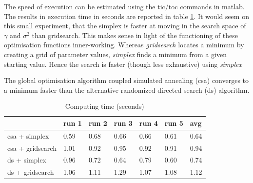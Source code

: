\documentclass[11pt, a4paper]{article}
\begin{document}
The speed of execution can be estimated using the tic/toc commands in
matlab. The results in execution time in seconds are reported in table
\ref{tab:computing_param}. It would seem on this small experiment,
that the simplex is faster at moving in the search space of $\gamma$
and $\sigma^2$ than gridsearch. This makes sense in light of the
functioning of these optimisation functions inner-working. Whereas
\emph{gridsearch} locates a minimum by creating a grid of parameter
values, \emph{simplex} finds a minimum from a given starting
value. Hence the search is faster (though less exhaustive) using
\emph{simplex}

The global optimisation algorithm coupled simulated annealing (csa)
converges to a minimum faster than the alternative randomized directed
search (ds) algorithm.

\begin{table}[H]
  \centering
  \begin{tabular}{l|l|l|l|l|l|l|}
    \cline{2-7}
    & run 1 & run 2 & run 3 & run 4 & run 5 & avg  \\ \hline
    \multicolumn{1}{|l|}{csa + simplex}    & 0.59  & 0.68  & 0.66  & 0.66  & 0.61  & 0.64 \\ \hline
    \multicolumn{1}{|l|}{csa + gridsearch} & 1.01  & 0.92  & 0.95  & 0.92  & 0.91  & 0.94 \\ \hline
    \multicolumn{1}{|l|}{ds + simplex}     & 0.96  & 0.72  & 0.64  & 0.79  & 0.60  & 0.74 \\ \hline
    \multicolumn{1}{|l|}{ds + gridsearch}  & 1.06  & 1.11  & 1.29  & 1.07  & 1.08  & 1.12 \\ \hline
  \end{tabular}
  \caption{Computing time (seconds)}
  \label{tab:computing_param}
\end{table}

\end{document}
